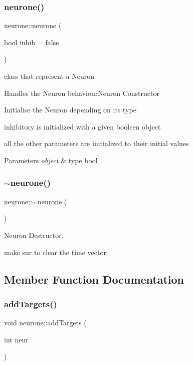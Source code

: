 \subsubsection{\texorpdfstring{neurone()}{neurone()}}
{\footnotesize\ttfamily neurone\+::neurone (\begin{DoxyParamCaption}\item[{bool}]{inhib = {\ttfamily false} }\end{DoxyParamCaption})}



class that represent a Neuron 

Handles the Neuron behaviour\+Neuron Constructor

Initialise the Neuron depending on it\textquotesingle{}s type

inhibitory is initialized with a given booleen object

all the other parameters are initialized to their initial values


\begin{DoxyParams}{Parameters}
{\em object} & type bool \\
\hline
\end{DoxyParams}
\mbox{\label{classneurone_a88029788e99ac38981e04959a777a227}} 
\subsubsection{\texorpdfstring{$\sim$neurone()}{~neurone()}}
{\footnotesize\ttfamily neurone\+::$\sim$neurone (\begin{DoxyParamCaption}{ }\end{DoxyParamCaption})}



Neuron Destructor. 

make sur to clear the time vector 

\subsection{Member Function Documentation}
\mbox{\label{classneurone_a8c25852b6c75970227a57b51665dd5b8}} 
\subsubsection{\texorpdfstring{add\+Targets()}{addTargets()}}
{\footnotesize\ttfamily void neurone\+::add\+Targets (\begin{DoxyParamCaption}\item[{int}]{neur }\end{DoxyParamCaption})}




